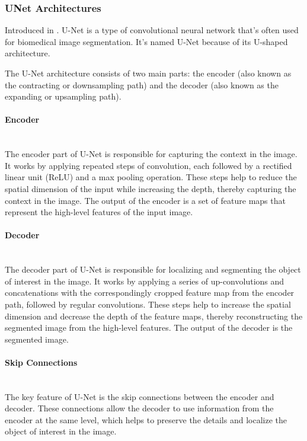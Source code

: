 \subsubsection{UNet Architectures}

Introduced in \cite{ronneberger2015u-net}. U-Net is a type of convolutional neural network that's often used for biomedical image segmentation. It's named U-Net because of its U-shaped architecture.

The U-Net architecture consists of two main parts: the encoder (also known as the contracting or downsampling path) and the decoder (also known as the expanding or upsampling path).

\paragraph{Encoder}\mbox{}\\
The encoder part of U-Net is responsible for capturing the context in the image. It works by applying repeated steps of convolution, each followed by a rectified linear unit (ReLU) and a max pooling operation. These steps help to reduce the spatial dimension of the input while increasing the depth, thereby capturing the context in the image. The output of the encoder is a set of feature maps that represent the high-level features of the input image.

\paragraph{Decoder}\mbox{}\\
The decoder part of U-Net is responsible for localizing and segmenting the object of interest in the image. It works by applying a series of up-convolutions and concatenations with the correspondingly cropped feature map from the encoder path, followed by regular convolutions. These steps help to increase the spatial dimension and decrease the depth of the feature maps, thereby reconstructing the segmented image from the high-level features. The output of the decoder is the segmented image.

\paragraph{Skip Connections}\mbox{}\\
The key feature of U-Net is the skip connections between the encoder and decoder. These connections allow the decoder to use information from the encoder at the same level, which helps to preserve the details and localize the object of interest in the image.


